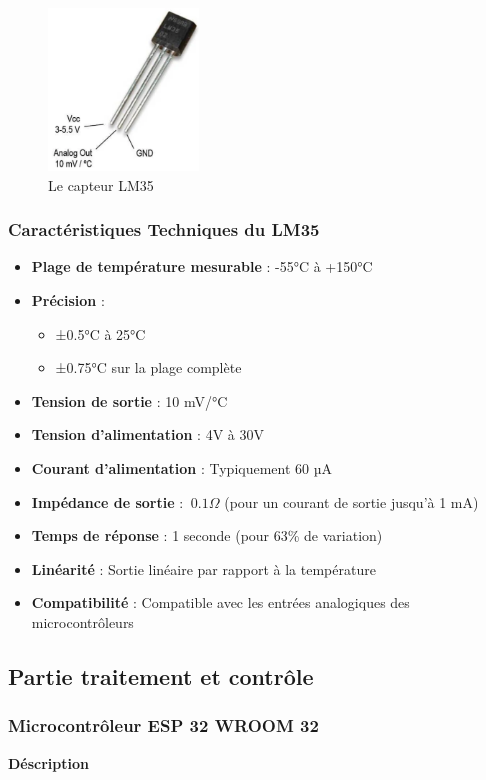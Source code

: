 \begin{figure}[H]
	\centering
	\includegraphics[width=4cm]{./img/composants/LM35.png}
	\caption{Le capteur LM35}
	\label{i1}
\end{figure}

\subsubsection*{Caractéristiques Techniques du LM35}
\begin{itemize}
	\item \textbf{Plage de température mesurable} : -55°C à +150°C
	\item \textbf{Précision} : 
	\begin{itemize}
		\item ±0.5°C à 25°C
		\item ±0.75°C sur la plage complète
	\end{itemize}
	\item \textbf{Tension de sortie} : 10 mV/°C
	\item \textbf{Tension d'alimentation} : 4V à 30V
	\item \textbf{Courant d'alimentation} : Typiquement 60 µA
	\item \textbf{Impédance de sortie} : $\ 0.1 \Omega $ (pour un courant de sortie jusqu’à 1 mA)
	\item \textbf{Temps de réponse} : 1 seconde (pour 63\% de variation)
	\item \textbf{Linéarité} : Sortie linéaire par rapport à la température
	\item \textbf{Compatibilité} : Compatible avec les entrées analogiques des microcontrôleurs
\end{itemize}

\subsection{Partie traitement et contrôle}
\subsubsection{Microcontrôleur ESP 32 WROOM 32}
\textbf{Déscription}


